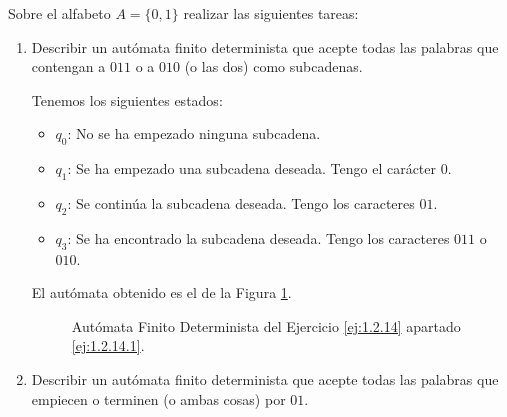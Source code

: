 \begin{ejercicio} \label{ej:1.2.14}
    Sobre el alfabeto $A = \{0, 1\}$ realizar las siguientes tareas:
    \begin{enumerate}
        \item \label{ej:1.2.14.1}
        Describir un autómata finito determinista que acepte todas las palabras que contengan a $011$ o a $010$ (o las dos) como subcadenas.
        
        Tenemos los siguientes estados:
        \begin{itemize}
            \item \ul{$q_0$}: No se ha empezado ninguna subcadena.
            \item \ul{$q_1$}: Se ha empezado una subcadena deseada. Tengo el carácter $0$.
            \item \ul{$q_2$}: Se continúa la subcadena deseada. Tengo los caracteres $01$.
            \item \ul{$q_3$}: Se ha encontrado la subcadena deseada. Tengo los caracteres $011$ o $010$.
        \end{itemize}

        El autómata obtenido es el de la Figura \ref{fig:ej:1.2.14.1}.
        \begin{figure}
            \centering
            \caption{Autómata Finito Determinista del Ejercicio \ref{ej:1.2.14} apartado \ref{ej:1.2.14.1}.}
            \label{fig:ej:1.2.14.1}
        \end{figure}
        
        \item \label{ej:1.2.14.2}
        Describir un autómata finito determinista que acepte todas las palabras que empiecen o terminen (o ambas cosas) por $01$.
        

\end{enumerate}
\end{ejercicio}
